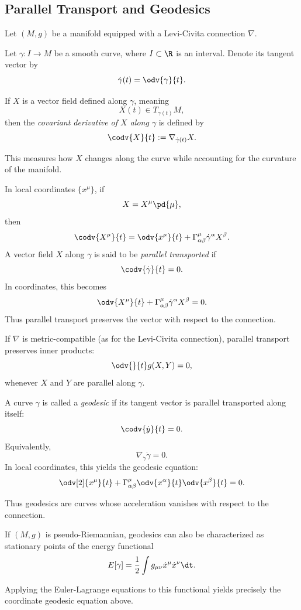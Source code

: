 \subsection{Parallel Transport and Geodesics} Let $(M, g)$ be a manifold equipped with a Levi-Civita connection $\nabla$.

Let $\gamma : I \to M$ be a smooth curve, where $I \subset \R$ is an interval. Denote its tangent vector by
\[%
  \dot{\gamma}(t) = \odv{\gamma}{t}
.\]%

If $X$ is a vector field defined along $\gamma$, meaning
\[%
  X(t) \in T_{\gamma(t)} M
,\]%
then the \emph{covariant derivative of $X$ along $\gamma$} is defined by
\[%
  \codv{X}{t} := \nabla_{\dot{\gamma}(t)} X
.\]%

This measures how $X$ changes along the curve while accounting for the curvature of the manifold.

In local coordinates $\{x^\mu\}$, if
\[%
  X = X^\mu \pd{\mu}
,\]%
then
\[%
  \codv{X^\mu}{t} = \odv{x^\mu}{t} + \Gamma^\mu_{\alpha\beta} \dot{\gamma}^\alpha X^\beta
.\]%
A vector field $X$ along $\gamma$ is said to be \emph{parallel transported} if
\[%
  \codv{\dot{\gamma}}{t} = 0
.\]%
In coordinates, this becomes
\[%
  \odv{X^\mu}{t}
  +
  \Gamma^\mu_{\alpha\beta}
  \dot{\gamma}^\alpha
  X^\beta
  =
  0.
\]%
Thus parallel transport preserves the vector with respect to the connection.

If $\nabla$ is metric-compatible (as for the Levi-Civita connection), parallel transport preserves inner products:
\[%
  \odv{}{t} g(X, Y) = 0
,\]%
whenever $X$ and $Y$ are parallel along $\gamma$.

A curve $\gamma$ is called a \emph{geodesic} if its tangent vector is parallel transported along itself:
\[%
  \codv{\dot{y}}{t} = 0
.\]%
Equivalently,
\[%
  \nabla_{\dot{\gamma}} \dot{\gamma} = 0
.\]%
In local coordinates, this yields the geodesic equation:
\[%
  \odv[2]{x^\mu}{t} + \Gamma^\mu_{\alpha\beta} \odv{x^\alpha}{t} \odv{x^\beta}{t} = 0
.\]%

Thus geodesics are curves whose acceleration vanishes with respect to the connection.

If $(M, g)$ is pseudo-Riemannian, geodesics can also be characterized as stationary points of the energy functional
\[%
  E[\gamma] = \frac{1}{2} \int g_{\mu\nu} \dot{x}^\mu \dot{x}^\nu \dt
.\]%

Applying the Euler-Lagrange equations to this functional yields precisely the coordinate geodesic equation above.

